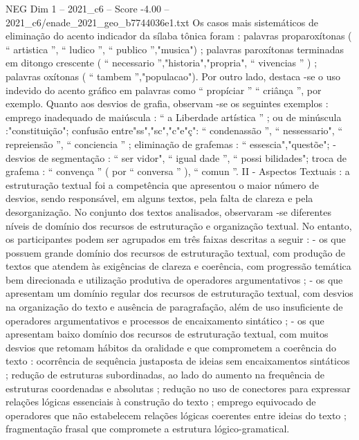 \begin{textsample}{NEG Dim 1 – 2021\_c6 – Score -4.00 – 2021\_c6/enade\_2021\_geo\_b7744036e1.txt}
Os casos mais sistemáticos de eliminação do acento indicador da sílaba tônica foram : palavras proparoxítonas ( “ artistica ”, “ ludico ”, “ publico ”,"musica") ; palavras paroxítonas terminadas em ditongo crescente ( “ necessario ”,"historia","propria", “ vivencias ” ) ; palavras oxítonas ( “ tambem ”,"populacao").
Por outro lado, destaca -se o uso indevido do acento gráfico em palavras como “ propíciar ” “ criânça ”, por exemplo.
Quanto aos desvios de grafia, observam -se os seguintes exemplos : emprego inadequado de maiúscula : “ a Liberdade artística ” ; ou de minúscula :"constituição"; confusão entre"ss","sc","c"e"ç": “ condenassão ”, “ nessessario", “ repreiensão ”, “ conciencia ” ; eliminação de grafemas : “ essescia","questõe"; - desvios de segmentação : “ ser vidor", “ igual dade ”, “ possi bilidades"; troca de grafema : “ convença ” ( por “ conversa ” ), “ comun ”.
II - Aspectos Textuais : a estruturação textual foi a competência que apresentou o maior número de desvios, sendo responsável, em alguns textos, pela falta de clareza e pela desorganização.
No conjunto dos textos analisados, observaram -se diferentes níveis de domínio dos recursos de estruturação e organização textual.
No entanto, os participantes podem ser agrupados em três faixas descritas a seguir : - os que possuem grande domínio dos recursos de estruturação textual, com produção de textos que atendem às exigências de clareza e coerência, com progressão temática bem direcionada e utilização produtiva de operadores argumentativos ; - os que apresentam um domínio regular dos recursos de estruturação textual, com desvios na organização do texto e ausência de paragrafação, além de uso insuficiente de operadores argumentativos e processos de encaixamento sintático ; - os que apresentam baixo domínio dos recursos de estruturação textual, com muitos desvios que retomam hábitos da oralidade e que comprometem a coerência do texto : ocorrência de sequência justaposta de ideias sem encaixamentos sintáticos ; redução de estruturas subordinadas, ao lado do aumento na frequência de estruturas coordenadas e absolutas ; redução no uso de conectores para expressar relações lógicas essenciais à construção do texto ; emprego equivocado de operadores que não estabelecem relações lógicas coerentes entre ideias do texto ; fragmentação frasal que compromete a estrutura lógico-gramatical.

\end{textsample}
